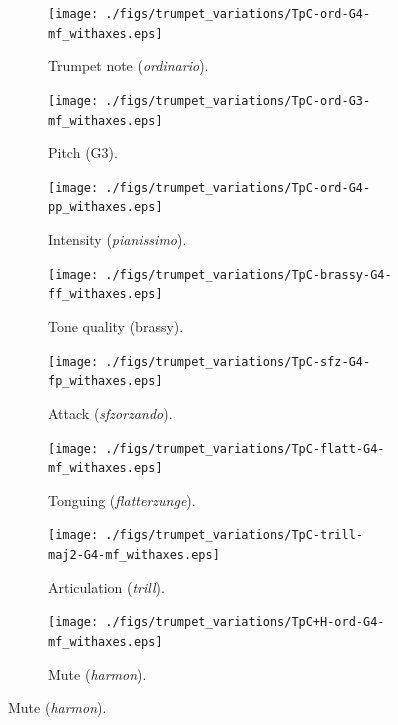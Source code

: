 \documentclass{article}
\begin{document}
\begin{figure}
        \begin{subfigure}{0.25\textwidth}
                \centering
                \texttt{[image: ./figs/trumpet\_variations/TpC-ord-G4-mf\_withaxes.eps]}
                \caption{Trumpet note (\emph{ordinario}).}
                \label{fig:TpC-ord-G4-mf_withaxes}
        \end{subfigure}%
        \begin{subfigure}{0.25\textwidth}
                \centering
                \texttt{[image: ./figs/trumpet\_variations/TpC-ord-G3-mf\_withaxes.eps]}
                \caption{Pitch (G3).}
                \label{fig:TpC-ord-G3-mf_withaxes}
        \end{subfigure}%
        
        \begin{subfigure}{0.25\textwidth}
                \centering
                \texttt{[image: ./figs/trumpet\_variations/TpC-ord-G4-pp\_withaxes.eps]}
                \caption{Intensity (\emph{pianissimo}).}
                \label{fig:TpC-ord-G4-pp_withaxes}
        \end{subfigure}%
        \begin{subfigure}{0.25\textwidth}
                \centering
                \texttt{[image: ./figs/trumpet\_variations/TpC-brassy-G4-ff\_withaxes.eps]}
                \caption{Tone quality (brassy).}
                \label{fig:TpC-brassy-G4-mf_withaxes}
        \end{subfigure}%
        
        \begin{subfigure}{0.25\textwidth}
                \centering
                \texttt{[image: ./figs/trumpet\_variations/TpC-sfz-G4-fp\_withaxes.eps]}
                \caption{Attack (\emph{sfzorzando}).}
                \label{fig:TpC-sfz-G4-fp_withaxes}
        \end{subfigure}%
        \begin{subfigure}{0.25\textwidth}
                \centering
                \texttt{[image: ./figs/trumpet\_variations/TpC-flatt-G4-mf\_withaxes.eps]}
                \caption{Tonguing (\emph{flatterzunge}).}
                \label{fig:TpC-flatt-G4-mf_withaxes}
        \end{subfigure}
        
       
        \begin{subfigure}[b]{0.25\textwidth}
                \centering
                \texttt{[image: ./figs/trumpet\_variations/TpC-trill-maj2-G4-mf\_withaxes.eps]}
                \caption{Articulation (\emph{trill}).}
                \label{fig:TpC-trill-maj2-G4-mf_withaxes}
        \end{subfigure}%
        \begin{subfigure}[b]{0.25\textwidth}
                \centering
                \texttt{[image: ./figs/trumpet\_variations/TpC+H-ord-G4-mf\_withaxes.eps]}
                \caption{Mute (\emph{harmon}).}
                \label{fig:TpC+H-ord-G4-mf_withaxes}
        \end{subfigure}
        

\end{figure}
\end{document}
